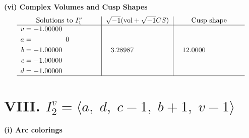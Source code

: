\documentclass[1p]{elsarticle_modified}
\theoremstyle{definition}
\newcommand{\I}{\sqrt{-1}}
\begin{document}
\newpage\flushleft \textbf{(vi) Complex Volumes and Cusp Shapes}
$$\begin{array}{c|c|c}  
\text{Solutions to }I^v_{1}& \I (\text{vol} + \sqrt{-1}CS) & \text{Cusp shape}\\
 \hline 
\begin{aligned}
v &= -1.00000\phantom{ +0.000000I} \\
a &= \phantom{-0.000000 } 0 \\
b &= -1.00000\phantom{ +0.000000I} \\
c &= -1.00000\phantom{ +0.000000I} \\
d &= -1.00000\phantom{ +0.000000I}\end{aligned}
 & \phantom{-}3.28987\phantom{ +0.000000I} & \phantom{-}12.0000\phantom{ +0.000000I}\\
 \hline 
 \end{array}$$\newpage\newpage\renewcommand{\arraystretch}{1}
\centering \section*{VIII. $I^v_{2}= \langle a,\;d,\;c-1,\;b+1,\;v-1 \rangle$}
\flushleft \textbf{(i) Arc colorings}\\
\end{document}
